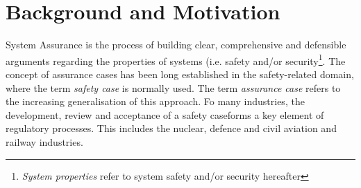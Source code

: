\section{Background and Motivation}
\label{sec:background}

System Assurance is the process of building clear, comprehensive and defensible arguments regarding the properties of systems (i.e. safety and/or security\footnote{\textit{System properties} refer to system safety and/or security hereafter}. 
The concept of assurance cases has been long established in the safety-related domain, where the term \textit{safety case} is normally used. The term \textit{assurance case} refers to the increasing generalisation of this approach. Fo many industries, the development, review and acceptance of a safety caseforms a key element of regulatory processes. This includes the nuclear, defence and civil aviation and railway industries. 



